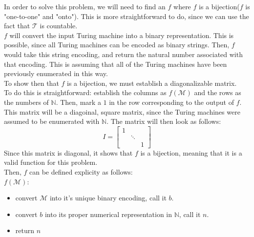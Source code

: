 \documentclass{exam} %
\newcommand{\NN}{\mathbb{N}}
\newcommand{\cl}[1]{\mathcal{#1}}  %
\theoremstyle{plain}
\theoremstyle{definition}
\theoremstyle{remark}
\numberwithin{equation}{section}  %
\begin{document}
\begin{questions}
In order to solve this problem, we will need to find an $f$ where $f$ is a 
bijection($f$ is "one-to-one" and "onto"). This is more straightforward to do,
since we can use the fact that $\cl{T}$ is countable.\\

$f$ will convert the input Turing machine into a binary representation. This is
possible, since all Turing machines can be encoded as binary strings. Then,
$f$ would take this string encoding, and return the natural number associated
with that encoding. This is assuming that all of the Turing machines have been 
previously enumerated in this way.\\

To show then that $f$ is a bijection, we must establish a diagonalizable matrix.\\

To do this is straightforward: establish the columns as $f(\cl{M})$ and the rows 
as the numbers of $\NN$. Then, mark a $1$ in the row corresponding to the output
of $f$. This matrix will be a diagoinal, square matrix, since the Turing machines
were assumed to be enumerated with $\NN$. The matrix will then look as follows:
  \[
      I =
      \begin{bmatrix}
      1 & & \\
      & \ddots & \\
      & & 1
      \end{bmatrix}
  \]
Since this matrix is diagonal, it shows that $f$ is a bijection, meaning that it
is a valid function for this problem.\\

Then, $f$ can be defined explicity as follows:\\

$f(\cl{M})$:
\begin{itemize}
  \item convert $\cl{M}$ into it's unique binary encoding, call it $b$.
  \item convert $b$ into its proper numerical representation in $\NN$, call it $n$.
  \item return $n$
\end{itemize}
\end{questions} 
\end{document}
